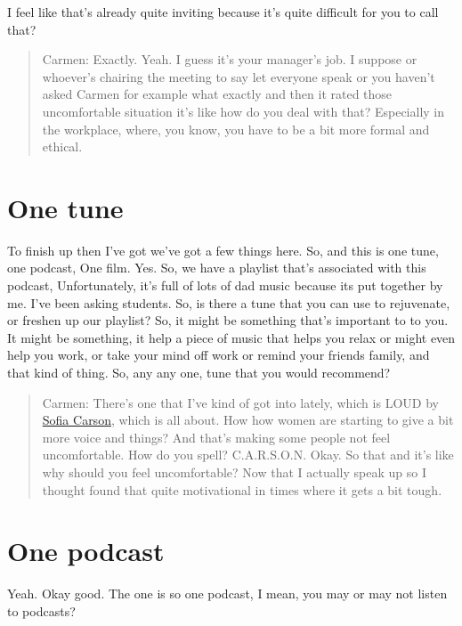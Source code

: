 \documentclass[
]{book}
\begin{document}
I feel like that's already quite inviting because it's quite difficult for you to call that?

\begin{quote}
Carmen: Exactly. Yeah. I guess it's your manager's job. I suppose or whoever's chairing the meeting to say let everyone speak or you haven't asked Carmen for example what exactly and then it rated those uncomfortable situation it's like how do you deal with that? Especially in the workplace, where, you know, you have to be a bit more formal and ethical.
\end{quote}

\hypertarget{cotopof}{%
\section{One tune}\label{cotopof}}

To finish up then I've got we've got a few things here. So, and this is one tune, one podcast, One film. Yes. So, we have a playlist that's associated with this podcast, Unfortunately, it's full of lots of dad music because its put together by me. I've been asking students. So, is there a tune that you can use to rejuvenate, or freshen up our playlist? So, it might be something that's important to to you. It might be something, it help a piece of music that helps you relax or might even help you work, or take your mind off work or remind your friends family, and that kind of thing. So, any any one, tune that you would recommend?

\begin{quote}
Carmen: There's one that I've kind of got into lately, which is LOUD by \href{https://en.wikipedia.org/wiki/Sofia_Carson}{Sofia Carson}, \citep{loud} which is all about. How how women are starting to give a bit more voice and things? And that's making some people not feel uncomfortable. How do you spell? C.A.R.S.O.N. Okay. So that and it's like why should you feel uncomfortable? Now that I actually speak up so I thought found that quite motivational in times where it gets a bit tough.
\end{quote}

\hypertarget{one-podcast}{%
\section{One podcast}\label{one-podcast}}

Yeah. Okay good. The one is so one podcast, I mean, you may or may not listen to podcasts?
\end{document}
